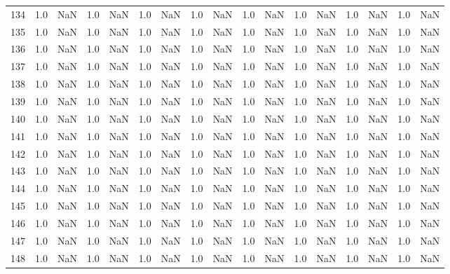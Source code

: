 \begin{tabular}{lrrrrrrrrrrrrrrrr}
    134 &  1.0 & NaN &   1.0 &   NaN &   1.0 &   NaN &   1.0 &   NaN &   1.0 &   NaN &   1.0 &   NaN &   1.0 &   NaN &   1.0 &   NaN \\
    135 &  1.0 & NaN &   1.0 &   NaN &   1.0 &   NaN &   1.0 &   NaN &   1.0 &   NaN &   1.0 &   NaN &   1.0 &   NaN &   1.0 &   NaN \\
    136 &  1.0 & NaN &   1.0 &   NaN &   1.0 &   NaN &   1.0 &   NaN &   1.0 &   NaN &   1.0 &   NaN &   1.0 &   NaN &   1.0 &   NaN \\
    137 &  1.0 & NaN &   1.0 &   NaN &   1.0 &   NaN &   1.0 &   NaN &   1.0 &   NaN &   1.0 &   NaN &   1.0 &   NaN &   1.0 &   NaN \\
    138 &  1.0 & NaN &   1.0 &   NaN &   1.0 &   NaN &   1.0 &   NaN &   1.0 &   NaN &   1.0 &   NaN &   1.0 &   NaN &   1.0 &   NaN \\
    139 &  1.0 & NaN &   1.0 &   NaN &   1.0 &   NaN &   1.0 &   NaN &   1.0 &   NaN &   1.0 &   NaN &   1.0 &   NaN &   1.0 &   NaN \\
    140 &  1.0 & NaN &   1.0 &   NaN &   1.0 &   NaN &   1.0 &   NaN &   1.0 &   NaN &   1.0 &   NaN &   1.0 &   NaN &   1.0 &   NaN \\
    141 &  1.0 & NaN &   1.0 &   NaN &   1.0 &   NaN &   1.0 &   NaN &   1.0 &   NaN &   1.0 &   NaN &   1.0 &   NaN &   1.0 &   NaN \\
    142 &  1.0 & NaN &   1.0 &   NaN &   1.0 &   NaN &   1.0 &   NaN &   1.0 &   NaN &   1.0 &   NaN &   1.0 &   NaN &   1.0 &   NaN \\
    143 &  1.0 & NaN &   1.0 &   NaN &   1.0 &   NaN &   1.0 &   NaN &   1.0 &   NaN &   1.0 &   NaN &   1.0 &   NaN &   1.0 &   NaN \\
    144 &  1.0 & NaN &   1.0 &   NaN &   1.0 &   NaN &   1.0 &   NaN &   1.0 &   NaN &   1.0 &   NaN &   1.0 &   NaN &   1.0 &   NaN \\
    145 &  1.0 & NaN &   1.0 &   NaN &   1.0 &   NaN &   1.0 &   NaN &   1.0 &   NaN &   1.0 &   NaN &   1.0 &   NaN &   1.0 &   NaN \\
    146 &  1.0 & NaN &   1.0 &   NaN &   1.0 &   NaN &   1.0 &   NaN &   1.0 &   NaN &   1.0 &   NaN &   1.0 &   NaN &   1.0 &   NaN \\
    147 &  1.0 & NaN &   1.0 &   NaN &   1.0 &   NaN &   1.0 &   NaN &   1.0 &   NaN &   1.0 &   NaN &   1.0 &   NaN &   1.0 &   NaN \\
    148 &  1.0 & NaN &   1.0 &   NaN &   1.0 &   NaN &   1.0 &   NaN &   1.0 &   NaN &   1.0 &   NaN &   1.0 &   NaN &   1.0 &   NaN \\

\end{tabular}
